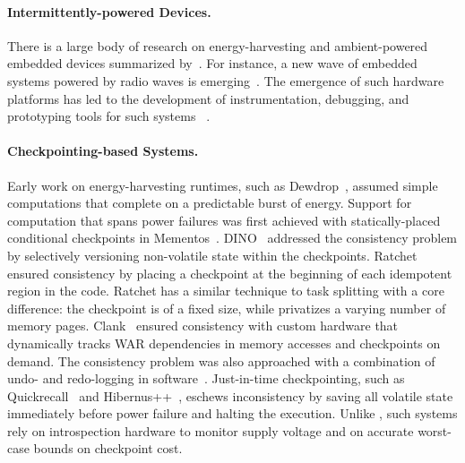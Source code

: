 \paragraph{Intermittently-powered Devices.}
There is a large body of research on energy-harvesting and ambient-powered embedded devices summarized by~\cite{prasad_comst_2014,sample_procieee_2013,huang:commag:2015,visser_procieee_2013,kamalinejad_commag_2015,ku_cst_2016}. For instance, a new wave of embedded systems powered by radio waves is emerging~\cite{patel_pervasive_2017,rf_powered_computing_gollakota_2014,wisp5,moo,zhao_rfid_2015,holleman_biocas_2008,thomas_jbcs_2012,naderiparizi_rfid_2015,rodriguez_tbcs_2015,liu_sigcomm_2013,kicksat,nadeau_naturebio_2017}. The emergence of such hardware platforms
has led to the development of instrumentation, debugging, and prototyping tools for such systems
~\cite{hester_sensys_2014,hester_sensys_2015,edb,capybara,stork,wisent,flicker}.

\paragraph{Checkpointing-based Systems.}
Early work on energy-harvesting runtimes, such as Dewdrop~\cite{dewdrop}, assumed simple computations that complete on a predictable burst of energy.
%
%
Support for computation that spans power failures was first achieved with statically-placed conditional checkpoints in Mementos~\cite{mementos}. 
DINO~\cite{dino} addressed the consistency problem by selectively versioning non-volatile state within the checkpoints. Ratchet~\cite{ratchet} ensured consistency by placing a checkpoint at the beginning of each idempotent region in the code. Ratchet has a similar technique to task splitting with a core difference: the checkpoint is of a fixed size, while \sys privatizes a varying number of memory pages.
%
%
Clank~\cite{hicks_isca_2017} ensured consistency with custom hardware that dynamically tracks WAR dependencies in memory accesses and checkpoints on demand. The consistency problem was also approached with a combination of undo- and redo-logging in software~\cite{baghsorkhi_cgo_2018}. Just-in-time checkpointing, such as Quickrecall~\cite{quickrecall} and Hibernus++~\cite{hibernusplusplus}, eschews inconsistency by saving all volatile state immediately before power failure and halting the execution. Unlike \sys, such systems rely on introspection hardware to monitor supply voltage and on accurate worst-case bounds on checkpoint cost.

